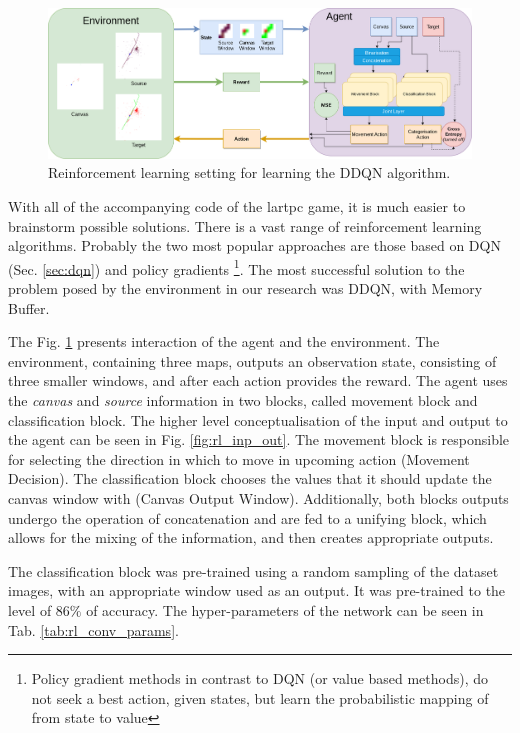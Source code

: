 \begin{figure}
  \centering
  \includegraphics[width=\textwidth]{figures/chapter7/lartpc_rl_flow.png}
  \caption{Reinforcement learning setting for learning the DDQN algorithm.}
  \label{fig:settings}
\end{figure}

With all of the accompanying code of the lartpc game, it is much easier to brainstorm possible solutions.
There is a vast range of reinforcement learning algorithms. Probably the two most popular approaches are those based on DQN (Sec. \ref{sec:dqn}) and policy gradients \footnote{
Policy gradient methods in contrast to DQN (or value based methods), do not seek a best action, given states, but learn the probabilistic mapping of from state to value}.
The most successful solution to the problem posed by the environment in our research was DDQN, with Memory Buffer.

The Fig. \ref{fig:settings} presents interaction of the agent and the environment.
The environment, containing three maps, outputs an observation state, consisting of three smaller windows, and after each action provides the reward.
The agent uses the \textit{canvas} and \textit{source} information in two blocks, called movement block and classification block.
The higher level conceptualisation of the input and output to the agent can be seen in Fig. \ref{fig:rl_inp_out}.
The movement block is responsible for selecting the direction in which to move in upcoming action (Movement Decision).
The classification block chooses the values that it should update the canvas window with (Canvas Output Window).
Additionally, both blocks outputs undergo the operation of concatenation and are fed to a unifying block, which allows for the mixing of the information, and then creates appropriate outputs.

The classification block was pre-trained using a random sampling of the dataset images, with an appropriate window used as an output. It was pre-trained to the level of $86\%$ of accuracy. The hyper-parameters of the network can be seen in Tab. \ref{tab:rl_conv_params}.

